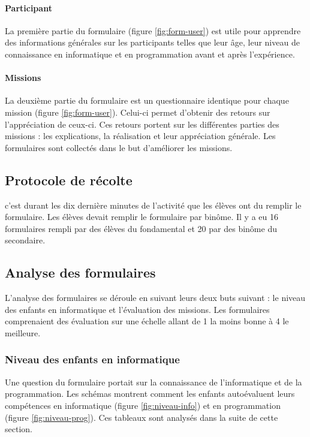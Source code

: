 \paragraph{Participant}
La première partie du formulaire (figure \ref{fig:form-user}) est utile pour apprendre des informations générales sur les participants telles que leur âge, leur niveau de connaissance en informatique et en programmation avant et après l'expérience.

\paragraph{Missions}
La deuxième partie du formulaire est un questionnaire identique pour chaque \gls{mission} (figure \ref{fig:form-user}). Celui-ci permet d'obtenir des retours sur l'appréciation de ceux-ci. Ces retours portent sur les différentes parties des \glspl{mission} : les explications, la réalisation et leur appréciation générale. Les formulaires sont collectés dans le but d'améliorer les \glspl{mission}.

\subsection{Protocole de récolte}
c'est durant les dix dernière minutes de l'activité que les élèves ont du remplir le formulaire. Les élèves devait remplir le formulaire par binôme. Il y a eu 16 formulaires rempli par des élèves du \gls{fondamental} et 20 par des binôme du \gls{secondaire}.

\subsection{Analyse des formulaires}
L'analyse des formulaires se déroule en suivant leurs deux buts suivant : le niveau des enfants en informatique et l'évaluation des \glspl{mission}. Les formulaires comprenaient des évaluation sur une échelle allant de 1 la moins bonne à 4 le meilleure.

\subsubsection{Niveau des enfants en informatique}
Une question du formulaire portait sur la connaissance de l'informatique et de la programmation. Les schémas montrent comment les enfants autoévaluent leurs compétences en informatique (figure \ref{fig:niveau-info}) et en programmation (figure \ref{fig:niveau-prog}). Ces tableaux sont analysés dans la suite de cette section.\\

